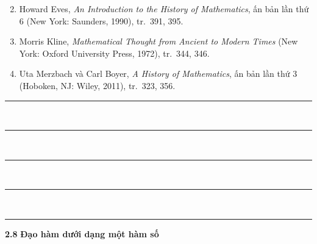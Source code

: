 \noindent
\begin{tcolorbox}[
    enhanced,
    colback=stewartgreenbg,
    colframe=stewartgreenbg,
    arc=0pt,
    outer arc=0pt,
    boxrule=0pt,
    left=0pt, right=0pt, top=7pt, bottom=7pt,
    width=\textwidth
]
\noindent
\hspace*{0.29\textwidth}%
\begin{minipage}[t]{0.71\textwidth}
  \footnotesize
  \begin{enumerate}[label=\textbf{\arabic*.}, leftmargin=1.5em, itemsep=3pt, parsep=0pt, topsep=0pt]
    \setcounter{enumi}{1}
    \item Howard Eves, \textit{An Introduction to the History of Mathematics}, ấn bản lần thứ 6 (New York: Saunders, 1990), tr.~391, 395.
    \item Morris Kline, \textit{Mathematical Thought from Ancient to Modern Times} (New York: Oxford University Press, 1972), tr.~344, 346.
    \item Uta Merzbach và Carl Boyer, \textit{A History of Mathematics}, ấn bản lần thứ 3 (Hoboken, NJ: Wiley, 2011), tr.~323, 356.
  \end{enumerate}
\end{minipage}
\end{tcolorbox}

\vspace{34pt}

\noindent
\begin{minipage}[c]{0.26\textwidth}
  \raggedleft
  {\color{stewartcyan}%
  \rule{48pt}{0.85pt}\\[2.8pt]
  \rule{48pt}{0.85pt}\\[2.8pt]
  \rule{48pt}{0.85pt}\\[2.8pt]
  \rule{48pt}{0.85pt}\\[2.8pt]
  \rule{48pt}{0.85pt}}%
\end{minipage}%
\hfill
\begin{minipage}[c]{0.71\textwidth}
  {\fontsize{22}{26}\selectfont\bfseries\sffamily\color{stewartcyan}2.8}\hspace{0.8em}%
  {\fontsize{18}{22}\selectfont\bfseries\sffamily Đạo hàm dưới dạng một hàm số}
\end{minipage}

\vspace{18pt}


